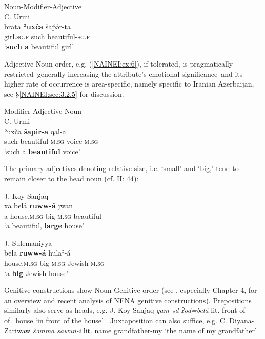 \documentclass[output=paper,colorlinks,citecolor=brown,draftmode]{langscibook}
\begin{document}
\ea\label{NAINEI:ex:5}
Noun-Modifier-Adjective\\
C. Urmi \citep[A42: §34]{Khan2016CUrmi} \\
\gll brata \textbf{ʾuxča} šap̂ə́r-ta  \\
     girl\textsc{.sg.f} such beautiful\textsc{-sg.f} \\
\glt `\textbf{such a} beautiful girl' 
\z

\begin{sloppypar}
Adjective-Noun order, e.g. (\ref{NAINEI:ex:6}), if tolerated, is pragmatically restricted–generally increasing the attribute's emotional significance–and its higher rate of occurrence is area-specific, namely specific to Iranian Azerbaijan, see §\ref{NAINEI:sec:3.2.5} for discussion. 
\end{sloppypar}

\ea\label{NAINEI:ex:6}
Modifier-Adjective-Noun\\
C. Urmi \citep[A3:§81]{Khan2016CUrmi}\\
\gll ʾuxča \textbf{šapir-a} qal-a  \\
     such beautiful\textsc{-m.sg} voice\textsc{-m.sg} \\
\glt `such a \textbf{beautiful} voice' 
\z

The primary adjectives denoting relative size, i.e. `small' and `big,' tend to remain closer to the head noun (cf. \citealt{Khan2016CUrmi}II: 44):

\ea\label{NAINEI:ex:7}
J. Koy Sanjaq \citep[202.§26]{Mutzafi2004Koya} \\
\gll xa belá \textbf{ruww-á} jwan \\
     a house\textsc{.m.sg} big\textsc{-m.sg} beautiful \\
\glt `a beautiful, \textbf{large} house' 
\z

\ea\label{NAINEI:ex:8}
J. Sulemaniyya \citep[R:§144]{Khan2004SuleyHalab}\\
\gll bela \textbf{ruww-á} hulaʾ-á \\
     house\textsc{.m.sg} big\textsc{-m.sg} Jewish\textsc{-m.sg} \\
\glt `a \textbf{big} Jewish house'
\z

Genitive constructions show Noun-Genitive order (see \citealt{Gutman2018AttNENA}, especially Chapter 4, for an overview and recent analysis of NENA genitive constructions). Prepositions similarly also serve as heads, e.g. J. Koy Sanjaq \textit{qam-əd ʔod=belá} lit. front-of of=house `in front of the house' \parencite[175]{Mutzafi2004Koya}. Juxtaposition can also suffice, e.g. C. Diyana-Zariwaw \textit{šəmma sawun-i} lit. name grandfather-my `the name of my grandfather' \parencite[315]{Napiorkowska2015DiyanaZ}. 
\end{document}
